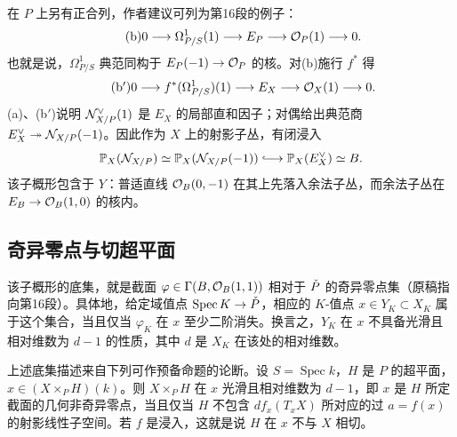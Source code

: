 在 $P$ 上另有正合列，作者建议可列为第16段的例子：
\begin{equation*}\tag{b}
0\longrightarrow\Omega^1_{P/S}(1)\longrightarrow E_P
 \longrightarrow\mathcal O_P(1)\longrightarrow0.
\end{equation*}
也就是说，$\Omega^1_{P/S}$ 典范同构于 $E_P(-1)\to\mathcal O_P$ 的核。对(b)施行 $f^*$ 得
\begin{equation*}\tag{b$'$}
0\longrightarrow f^*(\Omega^1_{P/S})(1)\longrightarrow E_X
 \longrightarrow\mathcal O_X(1)\longrightarrow0.
\end{equation*}
(a)、(b$'$)说明 $\mathcal N^\vee_{X/P}(1)$ 是 $E_X$ 的局部直和因子；对偶给出典范商 $E_X^\vee\twoheadrightarrow\mathcal N_{X/P}(-1)$。因此作为 $X$ 上的射影子丛，有闭浸入
\[
 \PP_X(\N_{X/P})\simeq \PP_X(\N_{X/P}(-1))
 \lhook\joinrel\longrightarrow \PP_X(E_X^\vee)\simeq B.
\]
该子概形包含于 $Y$：普适直线 $\mathcal O_B(0,-1)$ 在其上先落入余法子丛，而余法子丛在 $E_B\to\mathcal O_B(1,0)$ 的核内。


\subsection*{奇异零点与切超平面}
该子概形的底集，就是截面
$\varphi\in\Gamma(B,\mathcal O_B(1,1))$ 相对于 $\check P$ 的奇异零点集（原稿指向第16段）。具体地，给定域值点 $\operatorname{Spec}K\to\check P$，相应的 $K$-值点 $x\in Y_K\subset X_K$ 属于这个集合，当且仅当 $\varphi_K$ 在 $x$ 至少二阶消失。换言之，$Y_K$ 在 $x$ 不具备光滑且相对维数为 $d-1$ 的性质，其中 $d$ 是 $X_K$ 在该处的相对维数。

上述底集描述来自下列可作预备命题的论断。设 $S=\operatorname{Spec}k$，$H$ 是 $P$ 的超平面，$x\in (X\times_P H)(k)$。则 $X\times_P H$ 在 $x$ 光滑且相对维数为 $d-1$，即 $x$ 是 $H$ 所定截面的几何非奇异零点，当且仅当 $H$ 不包含 $df_x(T_xX)$ 所对应的过 $a=f(x)$ 的射影线性子空间。若 $f$ 是浸入，这就是说 $H$ 在 $x$ 不与 $X$ 相切。




